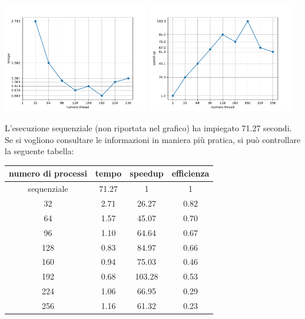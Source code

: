 \documentclass[12pt,openany]{report}
\begin{document}
\begin{center}
    \includegraphics[width=0.48\textwidth ]{images/tempi_MPI.pdf}
    \includegraphics[width=0.48\textwidth ]{images/speedup_MPI.pdf}
\end{center}
L'esecuzione sequenziale (non riportata nel grafico) ha impiegato 71.27 secondi.
\newpage
Se si vogliono consultare le informazioni in maniera più pratica, si può controllare la seguente tabella:
\begin{center}
    \begin{tabular}{|c|c|c|c|}
        \hline
        \rowcolor[HTML]{EFEFEF} 
        numero di processi & tempo   & speedup & efficienza   \\ \hline
        sequenziale      & 71.27 & 1         & 1 \\ \hline
        32               & 2.71  & 26.27 & 0.82 \\ \hline
        64               & 1.57   & 45.07 & 0.70 \\ \hline
        96               & 1.10  & 64.64 & 0.67 \\ \hline
        128              & 0.83  & 84.97 & 0.66 \\ \hline
        160              & 0.94  & 75.03 & 0.46 \\ \hline
        192              & 0.68    & 103.28 & 0.53 \\ \hline
        224              & 1.06  & 66.95 & 0.29 \\ \hline
        256              & 1.16  & 61.32  & 0.23 \\ \hline
    \end{tabular}
\end{center}
\end{document}
